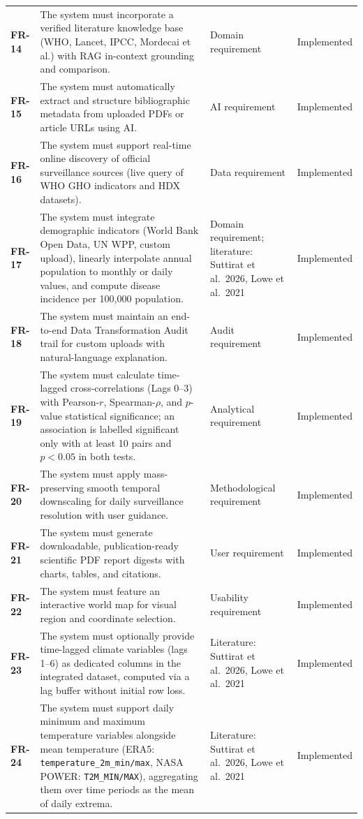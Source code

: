 \documentclass[11pt,a4paper]{article}
\begin{document}
\begin{longtable}{@{}>{\bfseries}p{1.6cm} L{7.4cm} L{3.6cm} L{2.4cm}@{}}
FR-14 & The system must incorporate a verified literature knowledge base (WHO, Lancet, IPCC, Mordecai et al.) with RAG in-context grounding and comparison. & Domain requirement & Implemented \\
FR-15 & The system must automatically extract and structure bibliographic metadata from uploaded PDFs or article URLs using AI. & AI requirement & Implemented \\
FR-16 & The system must support real-time online discovery of official surveillance sources (live query of WHO GHO indicators and HDX datasets). & Data requirement & Implemented \\
FR-17 & The system must integrate demographic indicators (World Bank Open Data, UN WPP, custom upload), linearly interpolate annual population to monthly or daily values, and compute disease incidence per 100,000 population. & Domain requirement; literature: Suttirat et al.\ 2026, Lowe et al.\ 2021 & Implemented \\
FR-18 & The system must maintain an end-to-end Data Transformation Audit trail for custom uploads with natural-language explanation. & Audit requirement & Implemented \\
FR-19 & The system must calculate time-lagged cross-correlations (Lags 0--3) with Pearson-$r$, Spearman-$\rho$, and $p$-value statistical significance; an association is labelled significant only with at least 10 pairs and $p < 0.05$ in both tests. & Analytical requirement & Implemented \\
FR-20 & The system must apply mass-preserving smooth temporal downscaling for daily surveillance resolution with user guidance. & Methodological requirement & Implemented \\
FR-21 & The system must generate downloadable, publication-ready scientific PDF report digests with charts, tables, and citations. & User requirement & Implemented \\
FR-22 & The system must feature an interactive world map for visual region and coordinate selection. & Usability requirement & Implemented \\
FR-23 & The system must optionally provide time-lagged climate variables (lags 1--6) as dedicated columns in the integrated dataset, computed via a lag buffer without initial row loss. & Literature: Suttirat et al.\ 2026, Lowe et al.\ 2021 & Implemented \\
FR-24 & The system must support daily minimum and maximum temperature variables alongside mean temperature (ERA5: \texttt{temperature\_2m\_min/max}, NASA POWER: \texttt{T2M\_MIN/MAX}), aggregating them over time periods as the mean of daily extrema. & Literature: Suttirat et al.\ 2026, Lowe et al.\ 2021 & Implemented \\

\end{longtable}
\end{document}
